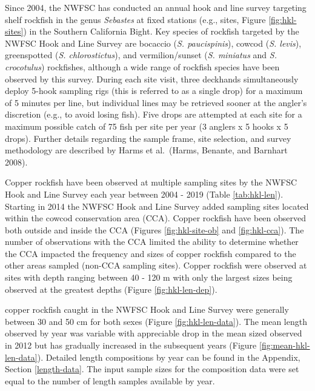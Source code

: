 \documentclass[11pt,
  english,
  a4paper,
]{article}
\begin{document}
Since 2004, the NWFSC has conducted an annual hook and line survey targeting shelf rockfish in the genus \emph{Sebastes} at fixed stations (e.g., sites, Figure \ref{fig:hkl-sites}) in the Southern California Bight. Key species of rockfish targeted by the NWFSC Hook and Line Survey are bocaccio (\emph{S. paucispinis}), cowcod (\emph{S. levis}), greenspotted (\emph{S. chlorostictus}), and vermilion/sunset (\emph{S. miniatus} and \emph{S. crocotulus}) rockfishes, although a wide range of rockfish species have been observed by this survey. During each site visit, three deckhands simultaneously deploy 5-hook sampling rigs (this is referred to as a single drop) for a maximum of 5 minutes per line, but individual lines may be retrieved sooner at the angler's discretion (e.g., to avoid losing fish). Five drops are attempted at each site for a maximum possible catch of 75 fish per site per year (3 anglers x 5 hooks x 5 drops). Further details regarding the sample frame, site selection, and survey methodology are described by Harms et al.~{(Harms, Benante, and Barnhart 2008)\leavevmode\tagmcend\tagstructend}.

\leavevmode\tagmcend\tagstructend\par


Copper rockfish have been observed at multiple sampling sites by the NWFSC Hook and Line Survey each year between 2004 - 2019 (Table \ref{tab:hkl-len}). Starting in 2014 the NWFSC Hook and Line Survey added sampling sites located within the cowcod conservation area (CCA). Copper rockfish have been observed both outside and inside the CCA (Figures \ref{fig:hkl-site-ob} and \ref{fig:hkl-cca}). The number of observations with the CCA limited the ability to determine whether the CCA impacted the frequency and sizes of copper rockfish compared to the other areas sampled (non-CCA sampling sites). Copper rockfish were observed at sites with depth ranging between 40 - 120 m with only the largest sizes being observed at the greatest depths (Figure \ref{fig:hkl-len-dep}).

\leavevmode\tagmcend\tagstructend\par


copper rockfish caught in the NWFSC Hook and Line Survey were generally between 30 and 50 cm for both sexes (Figure \ref{fig:hkl-len-data}). The mean length observed by year was variable with appreciable drop in the mean sized observed in 2012 but has gradually increased in the subsequent years (Figure \ref{fig:mean-hkl-len-data}). Detailed length compositions by year can be found in the Appendix, Section \ref{length-data}. The input sample sizes for the composition data were set equal to the number of length samples available by year.
\end{document}

